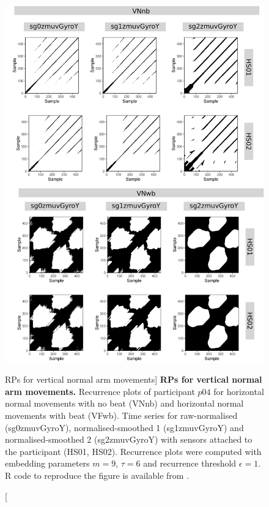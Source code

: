 \begin{figure}
\centering
\includegraphics[height=0.8\textheight]{rps_VN_w500_p04}
\caption
	[RPs for vertical normal arm movements]{
	{\bf RPs for vertical normal arm movements.}	
	Recurrence plots of participant $p04$ for 
	horizontal normal movements with no beat (VNnb) and
	horizontal normal movements with beat (VFwb).
	Time series for raw-normalised (sg0zmuvGyroY), 
	normalised-smoothed 1 (sg1zmuvGyroY) and 
	normalised-smoothed 2 (sg2zmuvGyroY) with
	sensors attached to the participant (HS01, HS02).
	Recurrence plots were computed with 
	embedding parameters $m=9$, $\tau=6$ and 
	recurrence threshold $\epsilon=1$.
	R code to reproduce the figure is available from \cite{xochicale2018}.
        }
    \label{fig:rps_VN_w500_p04}
\end{figure}




